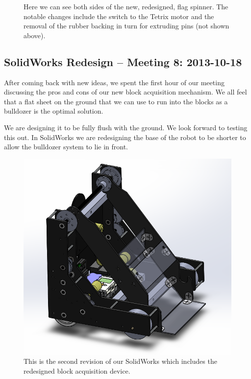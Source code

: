 \begin{figure}[H]
\begin{center}
\end{center}
\caption{Here we can see both sides of the new, redesigned, flag spinner. The notable changes include the switch to the Tetrix motor and the removal of the rubber backing in turn for extruding pins (not shown above).}
\end{figure}

\newpage \subsection{SolidWorks Redesign -- Meeting 8: 2013-10-18}
After coming back with new ideas, we spent the first hour of our meeting discussing the pros and cons of our new block acquisition mechanism. We all feel that a flat sheet on the ground that we can use to run into the blocks as a bulldozer is the optimal solution. 

We are designing it to be fully flush with the ground. We look forward to testing this out. In SolidWorks we are redesigning the base of the robot to be shorter to allow the bulldozer system to lie in front. 

\begin{figure}[h]
\begin{center}
\includegraphics[scale=0.75]{images/RobotV2.png}
\end{center}
\caption{This is the second revision of our SolidWorks which includes the redesigned block acquisition device.}
\end{figure}

